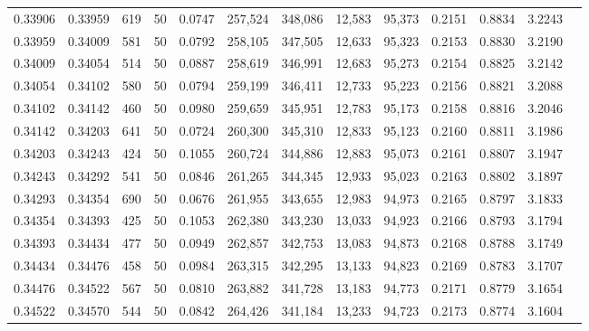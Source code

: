 \begin{tabular}{rrrrrrrrrrrrr}
0.33906 & 0.33959 &   619 &  50 &                                     0.0747 & 257,524 & 348,086 &  12,583 &  95,373 & 0.2151 & 0.8834 & 3.2243 \\
0.33959 & 0.34009 &   581 &  50 &                                     0.0792 & 258,105 & 347,505 &  12,633 &  95,323 & 0.2153 & 0.8830 & 3.2190 \\
0.34009 & 0.34054 &   514 &  50 &                                     0.0887 & 258,619 & 346,991 &  12,683 &  95,273 & 0.2154 & 0.8825 & 3.2142 \\
0.34054 & 0.34102 &   580 &  50 &                                     0.0794 & 259,199 & 346,411 &  12,733 &  95,223 & 0.2156 & 0.8821 & 3.2088 \\
0.34102 & 0.34142 &   460 &  50 &                                     0.0980 & 259,659 & 345,951 &  12,783 &  95,173 & 0.2158 & 0.8816 & 3.2046 \\
0.34142 & 0.34203 &   641 &  50 &                                     0.0724 & 260,300 & 345,310 &  12,833 &  95,123 & 0.2160 & 0.8811 & 3.1986 \\
0.34203 & 0.34243 &   424 &  50 &                                     0.1055 & 260,724 & 344,886 &  12,883 &  95,073 & 0.2161 & 0.8807 & 3.1947 \\
0.34243 & 0.34292 &   541 &  50 &                                     0.0846 & 261,265 & 344,345 &  12,933 &  95,023 & 0.2163 & 0.8802 & 3.1897 \\
0.34293 & 0.34354 &   690 &  50 &                                     0.0676 & 261,955 & 343,655 &  12,983 &  94,973 & 0.2165 & 0.8797 & 3.1833 \\
0.34354 & 0.34393 &   425 &  50 &                                     0.1053 & 262,380 & 343,230 &  13,033 &  94,923 & 0.2166 & 0.8793 & 3.1794 \\
0.34393 & 0.34434 &   477 &  50 &                                     0.0949 & 262,857 & 342,753 &  13,083 &  94,873 & 0.2168 & 0.8788 & 3.1749 \\
0.34434 & 0.34476 &   458 &  50 &                                     0.0984 & 263,315 & 342,295 &  13,133 &  94,823 & 0.2169 & 0.8783 & 3.1707 \\
0.34476 & 0.34522 &   567 &  50 &                                     0.0810 & 263,882 & 341,728 &  13,183 &  94,773 & 0.2171 & 0.8779 & 3.1654 \\
0.34522 & 0.34570 &   544 &  50 &                                     0.0842 & 264,426 & 341,184 &  13,233 &  94,723 & 0.2173 & 0.8774 & 3.1604 \\

\end{tabular}
